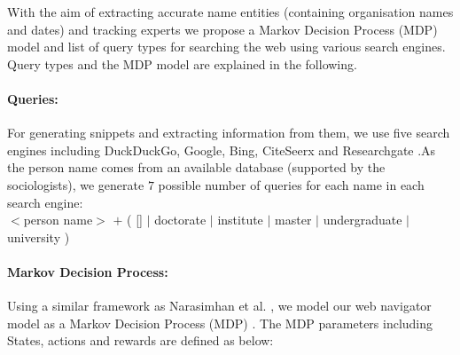 With the aim of extracting accurate name entities (containing organisation names and dates) and tracking experts we propose a Markov Decision Process (MDP) model and list of query types for searching the web using various search engines. Query types and the MDP model are explained in the following.

\paragraph{Queries: }  %
For generating snippets and extracting information from them, we use five search engines including DuckDuckGo, Google, Bing, CiteSeerx and Researchgate .As the person name comes from an available database (supported by the sociologists), we generate $7$ possible number of queries for each name in each search engine: \\

$<$person name$>$ $+$ (  [] $|$ doctorate $|$ institute $|$ master $|$ undergraduate $|$ university ) 

\paragraph{Markov Decision Process: } Using a similar framework as Narasimhan et al. , we model our web navigator model as a Markov Decision Process (MDP) \cite{puterman1994}. The MDP parameters including States, actions and rewards are defined as below:

